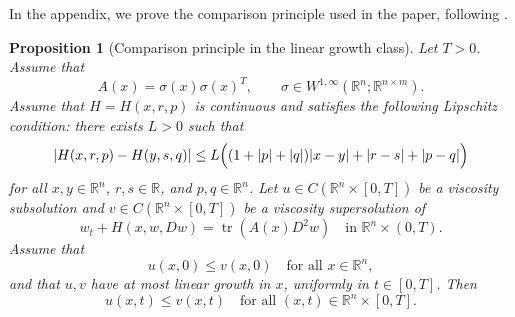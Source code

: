 \documentclass[preprint]{elsarticle}
\newtheorem{proposition}{Proposition}[section]
\numberwithin{equation}{section}
\begin{document}
In the appendix, we prove the comparison principle used in the paper, following \cite{CrandallIshiiLions1992}.
\begin{proposition}[Comparison principle in the linear growth class]
Let \(T>0\). Assume that
\[
 A(x)=\sigma(x)\sigma(x)^T,
 \qquad
 \sigma\in W^{1,\infty}(\mathbb R^n;\mathbb R^{n\times m}).
\]
Assume that \(H=H(x,r,p)\) is continuous and satisfies the following Lipschitz condition: there exists \(L>0\) such that
\[
 |H(x,r,p)-H(y,s,q)|
 \le
 L\Bigl((1+|p|+|q|)|x-y|+|r-s|+|p-q|\Bigr)
\]
for all \(x,y\in\mathbb R^n\), \(r,s\in\mathbb R\), and \(p,q\in\mathbb R^n\). Let \(u\in C(\mathbb R^n\times[0,T])\) be a viscosity subsolution and \(v\in C(\mathbb R^n\times[0,T])\) be a viscosity supersolution of
\[
 w_t+H(x,w,Dw)=\operatorname{tr}(A(x)D^2w)
 \quad\text{in }\mathbb R^n\times(0,T).
\]
Assume that
\[
 u(x,0)\le v(x,0)
 \quad\text{for all }x\in\mathbb R^n,
\]
and that \(u,v\) have at most linear growth in \(x\), uniformly in \(t\in[0,T]\). Then
\[
 u(x,t)\le v(x,t)
 \quad\text{for all }(x,t)\in\mathbb R^n\times[0,T].
\]
\end{proposition}
\end{document}
